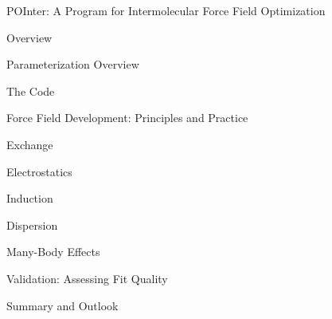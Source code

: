 
\begin{chapter}{POInter: A Program for Intermolecular Force Field Optimization}
\label{ch:pointer}

\newcommand{\vmultipolecolor}{\ensuremath{\sum\limits_{\textcolor{mon}{tu}}\textcolor{mon}{Q_t^i}T_{tu}\textcolor{mon}{Q_u^j}}\xspace}

\begin{section}{Overview}

\end{section}



\begin{section}{Parameterization Overview}

\end{section}

\begin{section}{The \pointer Code}

\end{section}

\begin{section}{Force Field Development: Principles and Practice}

\begin{subsection}{Exchange}
\label{sec:pointer-exchange}

\end{subsection}
\begin{subsection}{Electrostatics}
\label{sec:pointer-electrostatics}

\end{subsection}
\begin{subsection}{Induction}
\label{sec:pointer-induction}

\end{subsection}
\begin{subsection}{Dispersion}
\label{sec:pointer-dispersion}

\end{subsection}
\begin{subsection}{Many-Body Effects}

\end{subsection}
\end{section}

\begin{section}{Validation: Assessing Fit Quality}
\label{sec:pointer-validate}

\end{section}

\begin{section}{Summary and Outlook}
\label{sec:pointer-conclusions}

\end{section}





\end{chapter}
